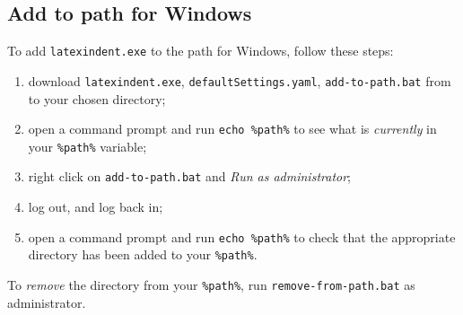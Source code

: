 \documentclass[11pt]{article}
\begin{document}
\subsection{Add to path for Windows}
To add \lstinline!latexindent.exe! to the path for Windows, follow these steps:
\begin{enumerate}
	\item download  \lstinline!latexindent.exe!, \lstinline!defaultSettings.yaml!,  \lstinline!add-to-path.bat!
	      from \cite{latexindent-home} to your chosen directory;
	\item open a command prompt and run \lstinline!echo %path%! to see what is \emph{currently} in your \lstinline!%path%! variable;
	\item right click on \lstinline!add-to-path.bat! and \emph{Run as administrator};
	\item log out, and log back in;
	\item open a command prompt and run \lstinline!echo %path%! to check that the appropriate directory has been added to your
	      \lstinline!%path%!.
\end{enumerate}
To \emph{remove} the directory from your \lstinline!%path%!, run \lstinline!remove-from-path.bat! as administrator.
\end{document}
